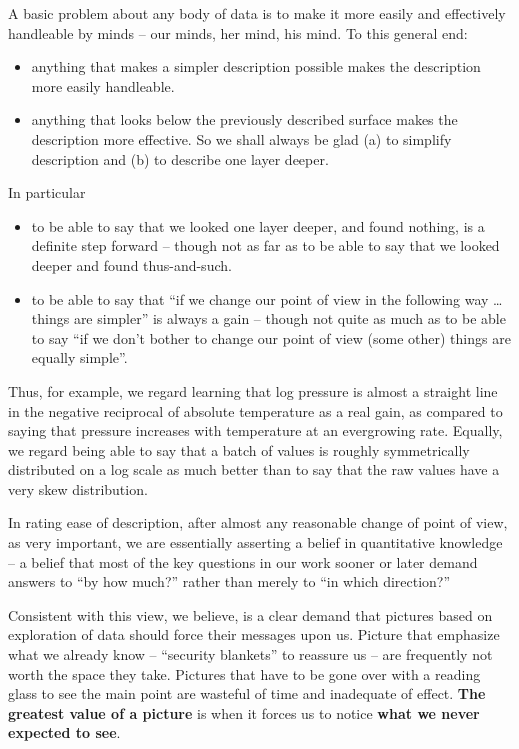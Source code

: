 \documentclass[
]{book}
\providecommand{\tightlist}{%
  \setlength{\itemsep}{0pt}\setlength{\parskip}{0pt}}
\begin{document}
A basic problem about any body of data is to make it more easily and effectively handleable by minds -- our minds, her mind, his mind. To this general end:

\begin{itemize}
\tightlist
\item
  anything that makes a simpler description possible makes the description more easily handleable.
\item
  anything that looks below the previously described surface makes the description more effective.
  So we shall always be glad (a) to simplify description and (b) to describe one layer deeper.
\end{itemize}

In particular

\begin{itemize}
\tightlist
\item
  to be able to say that we looked one layer deeper, and found nothing, is a definite step forward -- though not as far as to be able to say that we looked deeper and found thus-and-such.
\item
  to be able to say that ``if we change our point of view in the following way \ldots{} things are simpler'' is always a gain -- though not quite as much as to be able to say ``if we don't bother to change our point of view (some other) things are equally simple''.
\end{itemize}

Thus, for example, we regard learning that log pressure is almost a straight line in the negative reciprocal of absolute temperature as a real gain, as compared to saying that pressure increases with temperature at an evergrowing rate. Equally, we regard being able to say that a batch of values is roughly symmetrically distributed on a log scale as much better than to say that the raw values have a very skew distribution.

In rating ease of description, after almost any reasonable change of point of view, as very important, we are essentially asserting a belief in quantitative knowledge -- a belief that most of the key questions in our work sooner or later demand answers to ``by how much?'' rather than merely to ``in which direction?''

Consistent with this view, we believe, is a clear demand that pictures based on exploration of data should force their messages upon us. Picture that emphasize what we already know -- ``security blankets'' to reassure us -- are frequently not worth the space they take. Pictures that have to be gone over with a reading glass to see the main point are wasteful of time and inadequate of effect. \textbf{The greatest value of a picture} is when it forces us to notice \textbf{what we never expected to see}.
\end{document}
